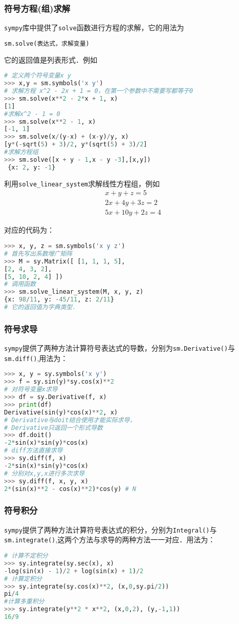 \subsubsection{符号方程(组)求解}
\verb|sympy|库中提供了\verb|solve|函数进行方程的求解，它的用法为
\begin{lstlisting}[language=python]
sm.solve(表达式，求解变量)
\end{lstlisting}
它的返回值是列表形式．例如
\begin{lstlisting}[language=python]
# 定义两个符号变量x y
>>> x,y = sm.symbols('x y')
# 求解方程 x^2 - 2x + 1 = 0，在第一个参数中不需要写都等于0
>>> sm.solve(x**2 - 2*x + 1, x)
[1] 
#求解x^2 - 1 = 0
>>> sm.solve(x**2 - 1, x)
[-1, 1]
>>> sm.solve(x/(y-x) + (x-y)/y, x)
[y*(-sqrt(5) + 3)/2, y*(sqrt(5) + 3)/2]
#求解方程组
>>> sm.solve([x + y - 1,x - y -3],[x,y])
 {x: 2, y: -1}
\end{lstlisting}

利用\verb|solve_linear_system|求解线性方程组，例如
\begin{align}
x+y+z=5 \\
2 x+4 y+3 z=2 \\
5 x+10 y+2 z=4
\end{align}

对应的代码为：
\begin{lstlisting}[language=python]
>>> x, y, z = sm.symbols('x y z')
# 首先写出系数增广矩阵
>>> M = sy.Matrix([ [1, 1, 1, 5],
[2, 4, 3, 2],
[5, 10, 2, 4] ])
# 调用函数
>>> sm.solve_linear_system(M, x, y, z)
{x: 98/11, y: -45/11, z: 2/11}
# 它的返回值为字典类型．
\end{lstlisting}

\subsubsection{符号求导}
\verb|sympy|提供了两种方法计算符号表达式的导数，分别为\verb|sm.Derivative()|与\verb|sm.diff()|,用法为：
\begin{lstlisting}[language=python]
>>> x, y = sy.symbols('x y')
>>> f = sy.sin(y)*sy.cos(x)**2
# 对符号变量x求导
>>> df = sy.Derivative(f, x)
>>> print(df)
Derivative(sin(y)*cos(x)**2, x)
# Derivative与doit结合使用才能实际求导，
# Derivative只返回一个形式导数
>>> df.doit() 
-2*sin(x)*sin(y)*cos(x)
# diff方法直接求导
>>> sy.diff(f, x)
-2*sin(x)*sin(y)*cos(x)
# 分别对x,y,x进行多次求导
>>> sy.diff(f, x, y, x)
2*(sin(x)**2 - cos(x)**2)*cos(y) # N
\end{lstlisting}

\subsubsection{符号积分}
\verb|sympy|提供了两种方法计算符号表达式的积分，分别为\verb|Integral()|与\verb|sm.integrate()|,这两个方法与求导的两种方法一一对应．用法为：
\begin{lstlisting}[language=python]
# 计算不定积分
>>> sy.integrate(sy.sec(x), x)
-log(sin(x) - 1)/2 + log(sin(x) + 1)/2
# 计算定积分
>>> sy.integrate(sy.cos(x)**2, (x,0,sy.pi/2))
pi/4
#计算多重积分
>>> sy.integrate(y**2 * x**2, (x,0,2), (y,-1,1))
16/9
\end{lstlisting}
